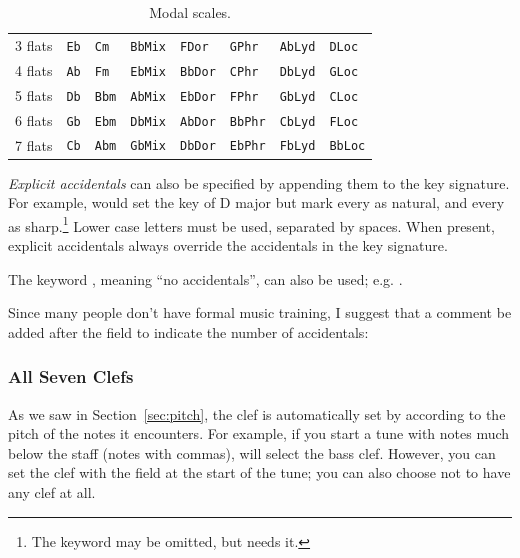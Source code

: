 \documentclass[a4paper,12pt]{book}
\begin{document}
\begin{table}[h]
\begin{tabular}{llllllll}
3 flats  & \texttt{Eb}  &  \texttt{Cm}   & \texttt{BbMix}  &
\texttt{FDor}   & \texttt{GPhr}   & \texttt{AbLyd}  & \texttt{DLoc} \\

4 flats  & \texttt{Ab}  &  \texttt{Fm}   & \texttt{EbMix}  &
\texttt{BbDor}  & \texttt{CPhr}   & \texttt{DbLyd}  & \texttt{GLoc} \\

5 flats  & \texttt{Db}  &  \texttt{Bbm}  & \texttt{AbMix}  &
\texttt{EbDor}  & \texttt{FPhr}   & \texttt{GbLyd}  & \texttt{CLoc} \\

6 flats  & \texttt{Gb}  &  \texttt{Ebm}  & \texttt{DbMix}  &
\texttt{AbDor}  & \texttt{BbPhr}  & \texttt{CbLyd}  & \texttt{FLoc} \\

7 flats  & \texttt{Cb}  &  \texttt{Abm}  & \texttt{GbMix}  &
\texttt{DbDor}  & \texttt{EbPhr}  & \texttt{FbLyd}  & \texttt{BbLoc} \\
\bottomrule %
\end{tabular}
\caption{Modal scales.}
\label{tab:modes}
\end{table}

\emph{Explicit accidentals} can also be specified by appending them to
the key signature. For example,  would set the
key of D major but mark every  as natural, and every  as
sharp.\footnote{The keyword  may be omitted, but \abcmid{}
needs it.} Lower case letters must be used, separated by spaces. When
present, explicit accidentals always override the accidentals in the
key signature.

The keyword , meaning ``no accidentals'', can also be
used; e.g. .

Since many people don't have formal music training, I suggest that a
comment be added after the  field to indicate the number of
accidentals: 


\subsubsection{All Seven Clefs}

As we saw in Section~\ref{sec:pitch}, the clef is automatically set by
\abcm{} according to the pitch of the notes it encounters. For
example, if you start a tune with notes much below the staff (notes
with commas), \abcm{} will select the bass clef. However, you can set
the clef with the  field at the start of the tune; you can
also choose not to have any clef at all.
\end{document}
